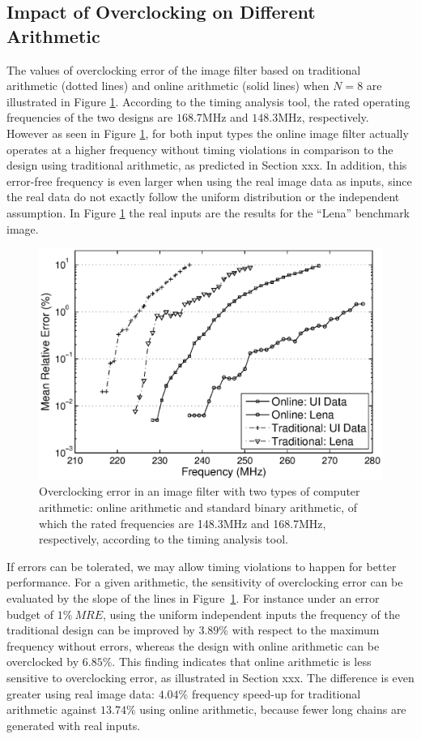 \documentclass{acm_proc_article-sp}
\begin{document}
\subsection{Impact of Overclocking on Different\\ Arithmetic}
The values of overclocking error of the image filter based on traditional arithmetic (dotted lines) and online arithmetic (solid lines) when $N=8$ are illustrated in Figure \ref{Fig:MRE_ImageFilter}. According to the timing analysis tool, the rated operating frequencies of the two designs are $168.7$MHz and $148.3$MHz, respectively. However as seen in Figure \ref{Fig:MRE_ImageFilter}, for both input types the online image filter actually operates at a higher frequency without timing violations in comparison to the design using traditional arithmetic, as predicted in Section xxx. In addition, this error-free frequency is even larger when using the real image data as inputs, since the real data do not exactly follow the uniform distribution or the independent assumption. In Figure \ref{Fig:MRE_ImageFilter} the real inputs are the results for the ``Lena'' benchmark image.
%
\begin{figure}
    \centering
    \includegraphics[width=.5\textwidth]{./Figures/MRE.eps}
    \caption{Overclocking error in an image filter with two types of computer arithmetic: online arithmetic and standard binary arithmetic, of which the rated frequencies are 148.3MHz and 168.7MHz, respectively, according to the timing analysis tool.}
\label{Fig:MRE_ImageFilter}
\end{figure}

If errors can be tolerated, we may allow timing violations to happen for better performance. For a given arithmetic, the sensitivity of overclocking error can be evaluated by the slope of the lines in Figure~\ref{Fig:MRE_ImageFilter}. For instance under an error budget of $1\%~MRE$, using the uniform independent inputs the frequency of the traditional design can be improved by $3.89\%$ with respect to the maximum frequency without errors, whereas the design with online arithmetic can be overclocked by $6.85\%$. This finding indicates that online arithmetic is less sensitive to overclocking error, as illustrated in Section xxx. The difference is even greater using real image data: $4.04\%$ frequency speed-up for traditional arithmetic against $13.74\%$ using online arithmetic, because fewer long chains are generated with real inputs.
\end{document}
